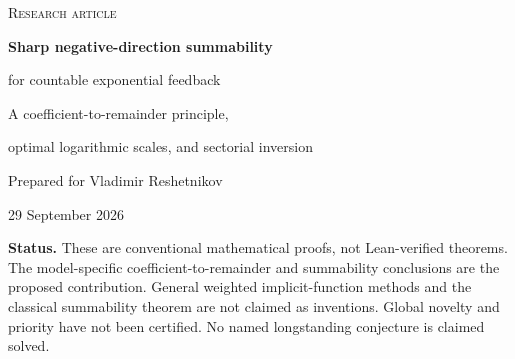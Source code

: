 \documentclass[11pt,a4paper]{article}
\numberwithin{equation}{section}
\theoremstyle{definition}\newtheorem{definition}[theorem]{Definition}
\theoremstyle{remark}\newtheorem{remark}[theorem]{Remark}
\begin{document}
\hypersetup{pageanchor=false}
\begin{titlepage}\centering
\vspace*{12mm}
{\small\scshape Research article\par}\vspace{9mm}
{\LARGE\bfseries Sharp negative-direction summability\par
for countable exponential feedback\par}\vspace{6mm}
{\Large A coefficient-to-remainder principle,\par
optimal logarithmic scales, and sectorial inversion\par}\vspace{10mm}
{\large Prepared for Vladimir Reshetnikov\par}\vspace{3mm}
29 September 2026\vspace{10mm}
\begin{minipage}{0.93\textwidth}
\begin{abstract}
Consider the formal and sectorial equation
\[
 U(q)=\sum_{j\ge1}q^j\exp(\lambda_jU(q)),\qquad \lambda_j\ge0.
\]
A recent ProveIt draft establishes coefficient regularity and a left-sector
realization but explicitly leaves uniform Gevrey remainders unproved.
We close that gap for a broad class of weights. The change of unknown
$U=qV$ gives a fixed dependent-variable disk about $V=1$. An exact
exponential-remainder estimate links the kernel to a positive subfamily
of the Lagrange coefficients. We prove that the canonical sectorial
solution has strong $\mathbb M$-asymptotics if and only if its formal
coefficients belong to $\mathcal C_{\mathbb M}$, under explicit elementary
weight hypotheses. In particular, strong Gevrey-$s$ asymptotics are
equivalent to $\lambda_j=O((j\log(j+1))^{s+1})$ for every $s>0$.
The classical sectorial characterization of summability then gives a
sharp application: for every $k>1$, negative-direction $k$-summability
holds if and only if $\lambda_j=O((j\log(j+1))^{1+1/k})$.
For $\lambda_j\asymp j^p(\log(\ee+j))^\beta$, $p>1$, we determine
the optimal factorial--logarithmic weight, up to geometric factors, and
prove actual truncation errors on the scale
$\exp[-c|q|^{-1/(p-1)}(\log(1/|q|))^{(p-\beta)/(p-1)}]$.
The results extend to the sectorial compositional inverse. Detailed
proofs, error certificates, exact checks, limitations, and further
research questions are included.
\end{abstract}
\end{minipage}\vfill
\begin{minipage}{0.93\textwidth}\small
\textbf{Status.} These are conventional mathematical proofs, not
Lean-verified theorems. The model-specific coefficient-to-remainder and
summability conclusions are the proposed contribution. General weighted
implicit-function methods and the classical summability theorem are not
claimed as inventions. Global novelty and priority have not been
certified. No named longstanding conjecture is claimed solved.
\end{minipage}
\end{titlepage}
\end{document}
